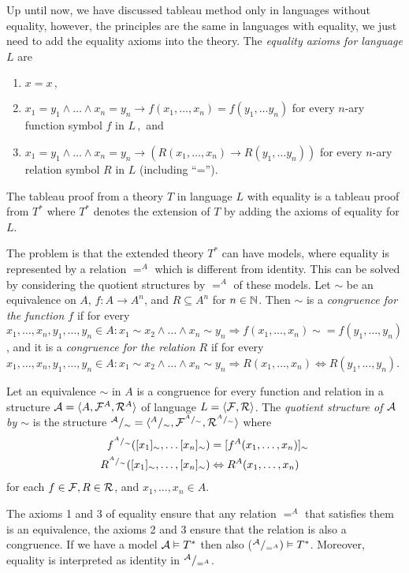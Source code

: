 Up until now, we have discussed tableau method only in languages without equality, however, the principles are the same in languages with equality, we just need to add the equality axioms into the theory. The \emph{equality axioms for language $L$} are 
\begin{enumerate}
	\item $x=x\,,$
	\item $x_1 = y_1 \land \dots \land x_n=y_n \to f(x_1, \dots, x_n) = f(y_1, \dots y_n)$ for every $n$-ary function symbol $f$ in $L\,,$ and
	\item $x_1 = y_1 \land \dots \land x_n=y_n \to (R(x_1, \dots, x_n) \to R(y_1, \dots y_n))$ for every $n$-ary relation symbol $R$ in $L$ (including ``='').
\end{enumerate}
The tableau proof from a theory $T$ in language $L$ with equality is a tableau proof from $T^*$ where $T^*$ denotes the extension of $T$ by adding the axioms of equality for $L$.

The problem is that the extended theory $T^*$ can have models, where equality is represented by a relation $=^A$ which is different from identity. This can be solved by considering the quotient structures by $=^A$ of these models. Let $\sim$ be an equivalence on $A$, $f: A \to A^n$, and $R\subseteq A^n$ for $n \in \mathbb{N}$. Then $\sim$ is a \emph{congruence for the function $f$} if for every $x_1, \dots, x_n, y_1, \dots, y_n \in A: x_1 \sim x_2 \land \dots \land x_n \sim y_n \Rightarrow f(x_1, \dots, x_n) \sim{=} f(y_1, \dots, y_n)$, and it is a \emph{congruence for the relation $R$} if for every $x_1, \dots, x_n, y_1, \dots, y_n \in A: x_1 \sim x_2 \land \dots \land x_n \sim y_n \Rightarrow R(x_1, \dots, x_n) \Leftrightarrow R(y_1, \dots, y_n)$. 

Let an equivalence $\sim$ in $A$ is a congruence for every function and relation in a structure $\mathcal{A} = \langle A, \mathcal{F}^A, \mathcal{R}^A \rangle$ of language $L = \langle \mathcal{F}, \mathcal{R} \rangle$. The \emph{quotient structure of $\mathcal{A}$ by $\sim$} is the structure $^{\mathcal{A}}/_{\sim} = \langle ^{A}/_{\sim}, \mathcal{F}^{^{A}/_{\sim}}, \mathcal{R}^{^{A}/_{\sim}} \rangle$ where
\begin{align*}
f^{^{A}/_{\sim}}([x_1]_\sim, \dots [x_n]_\sim)&=[f^A(x_1, \dots, x_n)]_\sim \\
R^{^{A}/_{\sim}}([x_1]_\sim, \dots, [x_n]_\sim) &\Leftrightarrow R^A(x_1, \dots, x_n)
\end{align*}
for each $f \in \mathcal{F}, R \in \mathcal{R}$, and $x_1, \dots, x_n \in A$. 

The axioms 1 and 3 of equality ensure that any relation $=^A$ that satisfies them is an equivalence, the axioms 2 and 3 ensure that the relation is also a congruence. If we have a model $\mathcal{A} \vDash T^*$ then also ($^{\mathcal{A}}/_{=^A}) \vDash T^*$. Moreover, equality is interpreted as identity in $^{\mathcal{A}}/_{=^A}$.

